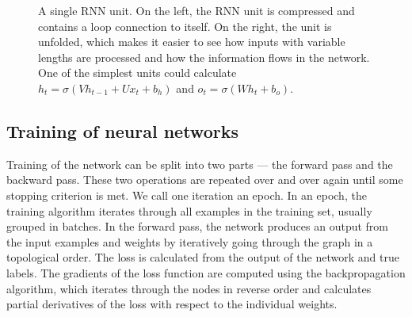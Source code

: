 \begin{figure}
    \centering
{}

\caption{A single RNN unit. On the left, the RNN unit is compressed and contains a loop connection to itself. On the right, the unit is unfolded, which makes it easier to see how inputs with variable lengths are processed and how the information flows in the network. One of the simplest units could calculate $h_t=\sigma(Vh_{t-1}+Ux_t + b_h)$ and $o_t=\sigma(Wh_{t}+b_o)$.}
\label{fig:rnn}
\end{figure}

\subsection{Training of neural networks}
Training of the network can be split into two parts --- the forward pass and the backward pass. These two operations are repeated over and over again until some stopping criterion is met. We call one iteration an epoch. In an epoch, the training algorithm iterates through all examples in the training set, usually grouped in batches. In the forward pass, the network produces an output from the input examples and weights by iteratively going through the graph in a topological order. The loss is calculated from the output of the network and true labels. The gradients of the loss function are computed using the backpropagation algorithm, which iterates through the nodes in reverse order and calculates partial derivatives of the loss with respect to the individual weights.

